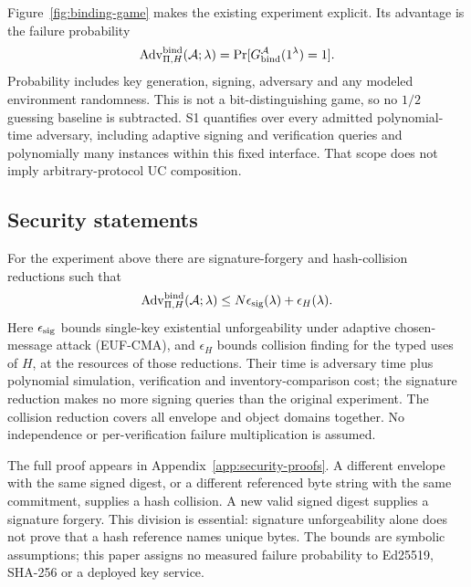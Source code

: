 Figure~\ref{fig:binding-game} makes the existing experiment explicit.
Its advantage is the failure probability
\[
 \operatorname{Adv}^{\rm bind}_{\Pi,H}(\mathcal A;\lambda)
 =\Pr[G_{\rm bind}^{\mathcal A}(1^\lambda)=1].
\]
Probability includes key generation, signing, adversary and any modeled
environment randomness. This is not a bit-distinguishing game, so no
$1/2$ guessing baseline is subtracted. S1 quantifies over every admitted
polynomial-time adversary, including adaptive signing and verification
queries and polynomially many instances within this fixed interface.
That scope does not imply arbitrary-protocol UC composition.

\subsection{Security statements}
\begin{securitytheorem}
\label{sec-thm:binding}
For the experiment above there are signature-forgery and hash-collision
reductions such that
\[
 \operatorname{Adv}^{\rm bind}_{\Pi,H}(\mathcal A;\lambda)
 \le N\epsilon_{\rm sig}(\lambda)+\epsilon_H(\lambda).
\]
Here $\epsilon_{\rm sig}$ bounds single-key existential unforgeability under
adaptive chosen-message attack (EUF-CMA), and $\epsilon_H$ bounds collision
finding for the typed uses of $H$, at the resources of those reductions.
Their time is adversary time plus polynomial simulation, verification and
inventory-comparison cost; the signature reduction makes no more signing
queries than the original experiment. The collision reduction covers all
envelope and object domains together. No independence or per-verification
failure multiplication is assumed.
\end{securitytheorem}
The full proof appears in Appendix~\ref{app:security-proofs}. A different
envelope with the same signed digest, or a different referenced byte string
with the same commitment, supplies a hash collision. A new valid signed
digest supplies a signature forgery. This division is essential: signature
unforgeability alone does not prove that a hash reference names unique bytes.
The bounds are symbolic assumptions; this paper assigns no measured
failure probability to Ed25519, SHA-256 or a deployed key service.

